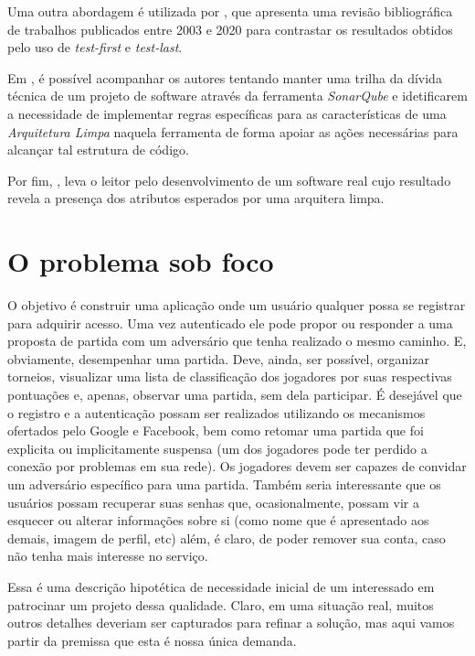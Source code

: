   Uma outra abordagem é utilizada por , que apresenta uma revisão bibliográfica de trabalhos publicados entre 2003 e 2020 para contrastar os resultados obtidos pelo uso de \emph{test-first} e \emph{test-last}.

  Em , é possível acompanhar os autores tentando manter uma trilha da dívida técnica de um projeto de software através da ferramenta \emph{SonarQube} e idetificarem a necessidade de implementar regras específicas para as características de uma \emph{Arquitetura Limpa} naquela ferramenta de forma apoiar as ações necessárias para alcançar tal estrutura de código.

  Por fim, , leva o leitor pelo desenvolvimento de um software real cujo resultado revela a presença dos atributos esperados por uma arquitera limpa.

\section{O problema sob foco}

  O objetivo é construir uma aplicação onde um usuário qualquer possa se registrar para adquirir acesso. Uma vez autenticado ele pode propor ou responder a uma proposta de partida com um adversário que tenha realizado o mesmo caminho. E, obviamente, desempenhar uma partida. Deve, ainda, ser possível, organizar torneios, visualizar uma lista de classificação dos jogadores por suas respectivas pontuações e, apenas, observar uma partida, sem dela participar. É desejável que o registro e a autenticação possam ser realizados utilizando os mecanismos ofertados pelo Google e Facebook, bem como retomar uma partida que foi explicita ou implicitamente suspensa (um dos jogadores pode ter perdido a conexão por problemas em sua rede). Os jogadores devem ser capazes de convidar um adversário específico para uma partida. Também seria interessante que os usuários possam recuperar suas senhas que, ocasionalmente, possam vir a esquecer ou alterar informações sobre si (como nome que é apresentado aos demais, imagem de perfil, etc) além, é claro, de poder remover sua conta, caso não tenha mais interesse no serviço.

  Essa é uma descrição hipotética de necessidade inicial de um interessado em patrocinar um projeto dessa qualidade. Claro, em uma situação real, muitos outros detalhes deveriam ser capturados para refinar a solução, mas aqui vamos partir da premissa que esta é nossa única demanda.


